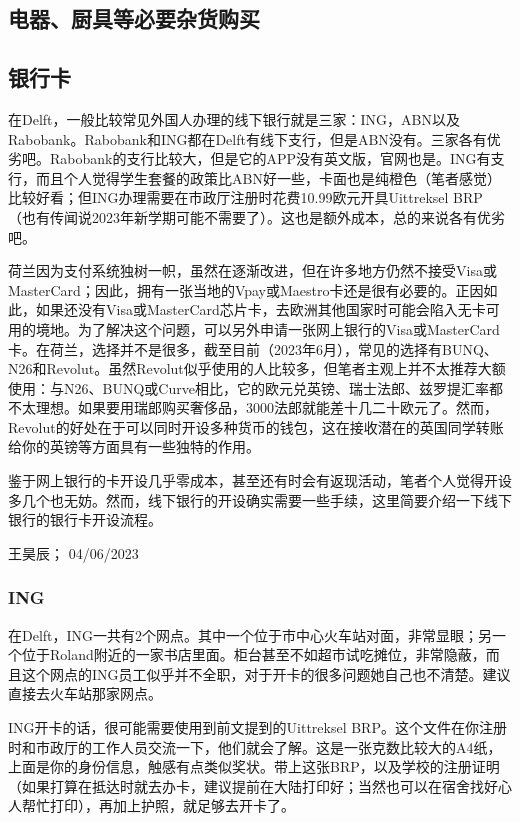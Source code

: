 \vspace{\betsubsec} %
\subsection{电器、厨具等必要杂货购买}

\vspace{\betsubsec} %
\subsection{银行卡}
在Delft，一般比较常见外国人办理的线下银行就是三家：ING，ABN以及Rabobank。Rabobank和ING都在Delft有线下支行，但是ABN没有。三家各有优劣吧。Rabobank的支行比较大，但是它的APP没有英文版，官网也是。ING有支行，而且个人觉得学生套餐的政策比ABN好一些，卡面也是纯橙色（笔者感觉）比较好看；但ING办理需要在市政厅注册时花费10.99欧元开具Uittreksel BRP （也有传闻说2023年新学期可能不需要了）。这也是额外成本，总的来说各有优劣吧。

荷兰因为支付系统独树一帜，虽然在逐渐改进，但在许多地方仍然不接受Visa或MasterCard；因此，拥有一张当地的Vpay或Maestro卡还是很有必要的。正因如此，如果还没有Visa或MasterCard芯片卡，去欧洲其他国家时可能会陷入无卡可用的境地。为了解决这个问题，可以另外申请一张网上银行的Visa或MasterCard卡。在荷兰，选择并不是很多，截至目前（2023年6月），常见的选择有BUNQ、N26和Revolut。虽然Revolut似乎使用的人比较多，但笔者主观上并不太推荐大额使用：与N26、BUNQ或Curve相比，它的欧元兑英镑、瑞士法郎、兹罗提汇率都不太理想。如果要用瑞郎购买奢侈品，3000法郎就能差十几二十欧元了。然而，Revolut的好处在于可以同时开设多种货币的钱包，这在接收潜在的英国同学转账给你的英镑等方面具有一些独特的作用。

鉴于网上银行的卡开设几乎零成本，甚至还有时会有返现活动，笔者个人觉得开设多几个也无妨。然而，线下银行的开设确实需要一些手续，这里简要介绍一下线下银行的银行卡开设流程。
\begin{flushright}
王昊辰； 04/06/2023
\end{flushright}

\subsubsection{ING}
在Delft，ING一共有2个网点。其中一个位于市中心火车站对面，非常显眼；另一个位于Roland附近的一家书店里面。柜台甚至不如超市试吃摊位，非常隐蔽，而且这个网点的ING员工似乎并不全职，对于开卡的很多问题她自己也不清楚。建议直接去火车站那家网点。

ING开卡的话，很可能需要使用到前文提到的Uittreksel BRP。这个文件在你注册时和市政厅的工作人员交流一下，他们就会了解。这是一张克数比较大的A4纸，上面是你的身份信息，触感有点类似奖状。带上这张BRP，以及学校的注册证明（如果打算在抵达时就去办卡，建议提前在大陆打印好；当然也可以在宿舍找好心人帮忙打印），再加上护照，就足够去开卡了。

